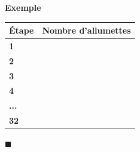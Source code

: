 \documentclass[a4paper,12pt,twoside]{article}
\numberwithin{dummy}{section}
\theoremstyle{ocrenumboxTh}
\theoremstyle{ocrenumboxExercice}
\theoremstyle{ocrenumboxExercice}
\theoremstyle{ocrenumboxEx}
\theoremstyle{ocrenumboxEx}
\theoremstyle{ocrenumboxTh}
\theoremstyle{ocrenumboxTh*}
\theoremstyle{ocrenumboxTh}
\theoremstyle{ocrenumboxTh*}
\theoremstyle{ocrenumboxCoro}
\theoremstyle{ocrenumboxCoro*}
\theoremstyle{ocrenumboxCoro}
\theoremstyle{ocrenumboxCoro*}
\theoremstyle{ocrenumboxProp}
\theoremstyle{ocrenumboxProp*}
\theoremstyle{ocrenumboxProp}
\theoremstyle{ocrenumboxProp*}
\theoremstyle{ocrenumboxMéthode}
\theoremstyle{ocrenumboxMéthode}
\theoremstyle{ocrenumboxDef}
\theoremstyle{ocrenumboxDef*}
\theoremstyle{ocrenumboxDef}
\theoremstyle{ocrenumboxDef*}
\theoremstyle{ocrenumboxReg}
\theoremstyle{ocrenumboxReg*}
\theoremstyle{ocrenumboxReg}
\theoremstyle{ocrenumboxReg*}
\theoremstyle{ocrenumboxVoc}
\theoremstyle{ocrenumboxVoc}
\theoremstyle{ocrenumboxNot}
\theoremstyle{ocrenumboxNot}
\theoremstyle{ocrenumboxNot*}
\theoremstyle{ocrenumboxNot*}
\theoremstyle{ocrenum}
\newenvironment{Exemple}
  {%
   \par\vspace{2pt}%
   {\sffamily\bfseries\color{Couleur8} Exemple} %
   \par\vspace{0pt}%
   \begin{exBox}%
  }
  {\hfill{\color{Couleur8}\tiny\ensuremath{\blacksquare}}\end{exBox}}
\newcommand{\ligne}{\noindent\dotfill\vspace{0.4em}}
\begin{document}
\begin{Exemple}
\begin{minipage}[c]{0.5\textwidth}
\ligne

\ligne

\end{minipage} \hfill \begin{minipage}[c]{0.5\textwidth}

\setlength{\arrayrulewidth}{1pt} %
\begin{center}
\renewcommand{\arraystretch}{1.2}
\begin{tabular}{|>{\centering\arraybackslash}p{1.4cm}|>{\centering\arraybackslash}p{4.5cm}|}
\hline
\cellcolor{Couleur10!20} \textbf{Étape} &\cellcolor{Couleur10!20}  \textbf{Nombre d'allumettes} \\
\hline
\textcolor{Couleur10}{\textbf{1}} &  \\
\hline
\textcolor{Couleur10}{\textbf{2}} &  \\
\hline
\textcolor{Couleur10}{\textbf{3}} &  \\
\hline
\textcolor{Couleur10}{\textbf{4}} & \phantom{$6 + 5 + 5 + 5 = 6 + \textcolor{Couleur10}{\textbf{3}} \times 5$} \\
\hline
\textbf{...} & \\
\hline
\textcolor{Couleur10}{\textbf{32}} &  \\
\hline
\end{tabular}
\end{center}
\end{minipage}

\end{Exemple}
\end{document}
